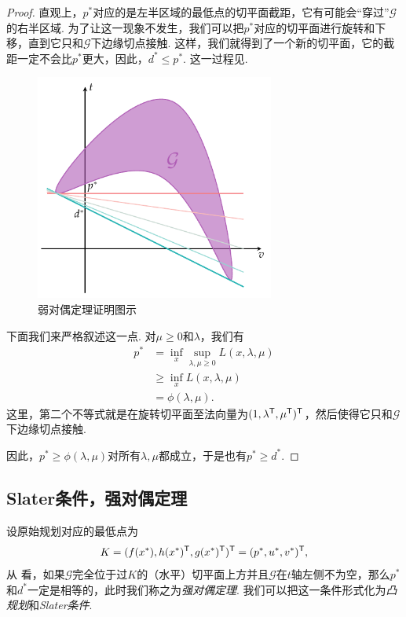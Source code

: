 \begin{proof}
    直观上，$p^*$对应的是左半区域的最低点的切平面截距，它有可能会“穿过”$\mathcal{G}$的右半区域. 为了让这一现象不发生，我们可以把$p^*$对应的切平面进行旋转和下移，直到它只和$\mathcal{G}$下边缘切点接触. 这样，我们就得到了一个新的切平面，它的截距一定不会比$p^*$更大，因此，$d^*\leq p^*$. 这一过程见.

    \begin{figure}[ht]
        \centering
        \includegraphics[width=0.7\textwidth]{figures/duality/weak-duality.pdf}
        \caption{弱对偶定理证明图示}
        \label{fig:weak-duality}    
    \end{figure}

    下面我们来严格叙述这一点. 对$\mu\geq 0$和$\lambda$，我们有
    \begin{align*}
        p^*&=\inf_{x} \sup_{\lambda,\mu\geq 0} L(x,\lambda,\mu)\\
           &\geq \inf_{x} L(x,\lambda,\mu)\\
           &=\phi(\lambda,\mu).       
    \end{align*}
    这里，第二个不等式就是在旋转切平面至法向量为$(1,\lambda^{\mathsf{T}},\mu^{\mathsf{T}})^{\mathsf{T}}$，然后使得它只和$\mathcal{G}$下边缘切点接触. 
    
    因此，$p^*\geq \phi(\lambda,\mu)$对所有$\lambda,\mu$都成立，于是也有$p^*\geq d^*$.
\end{proof}

\subsection{Slater条件，强对偶定理}

设原始规划对应的最低点为
    \[K=(f(x^*),h(x^*)^{\mathsf{T}},g(x^*)^{\mathsf{T}})^{\mathsf{T}}=(p^*,u^*,v^*)^{\mathsf{T}},\]
从 看，如果$\mathcal G$完全位于过$K$的（水平）切平面上方并且$\mathcal G$在$t$轴左侧不为空，那么$p^*$和$d^*$一定是相等的，此时我们称之为\emph{强对偶定理}. 我们可以把这一条件形式化为\emph{凸规划}和\emph{Slater条件}.

